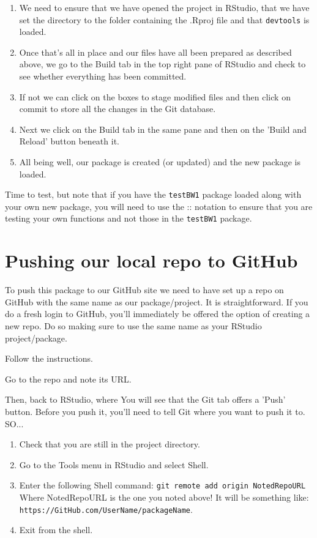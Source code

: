 \documentclass[titlepage]{book}\usepackage{knitr}
\begin{document}
\begin{enumerate}
\item{We need to ensure that we have opened the project in RStudio, that we have set the directory to the folder containing the .Rproj file and that \texttt{devtools} is loaded.}
\item{Once that's all in place and our files have all been prepared as described above, we go to the Build tab in the top right pane of RStudio and check to see whether everything has been committed.}
\item{If not we can click on the boxes to stage modified files and then click on commit to store all the changes in the Git database.}
\item{Next we click on the Build tab in the same pane and then on the 'Build and Reload' button beneath it.}
\item{All being well, our package is created (or updated) and the new package is loaded.}
\end{enumerate}

Time to test, but note that if you have the \texttt{testBW1} package loaded along with your own new package, you will need to use the :: notation to ensure that you are testing your own functions and not those in the \texttt{testBW1} package.

\section{Pushing our local repo to GitHub}

To push this package to our GitHub site we need to have set up a repo on GitHub with the same name as our package/project. It is straightforward.  If you do a fresh login to GitHub, you'll immediately be offered the option of creating a new repo. Do so making sure to use the same name as your RStudio project/package.

Follow the instructions.

Go to the repo and note its URL.

Then, back to RStudio, where You will see that the Git tab offers a 'Push' button. Before you push it, you'll need to tell Git where you want to push it to. SO...

\begin{enumerate}
\item{Check that you are still in the project directory.}
\item{Go to the Tools menu in RStudio and select Shell.}
\item{Enter the following Shell command: \texttt{git remote add origin NotedRepoURL} Where NotedRepoURL is the one you noted above! It will be something like: \texttt{https://GitHub.com/UserName/packageName}.}
\item{Exit from the shell.}
\end{enumerate}
\end{document}
